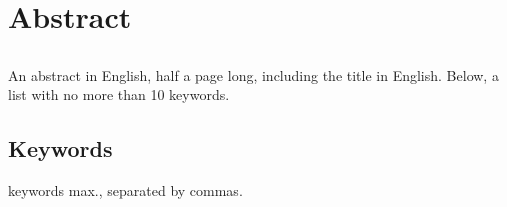 \chapter*{Abstract}

\section*{\tituloPortadaEngVal}

An abstract in English, half a page long, including the title in English. Below, a list with no more than 10 keywords.


\section*{Keywords}

 keywords max., separated by commas.



